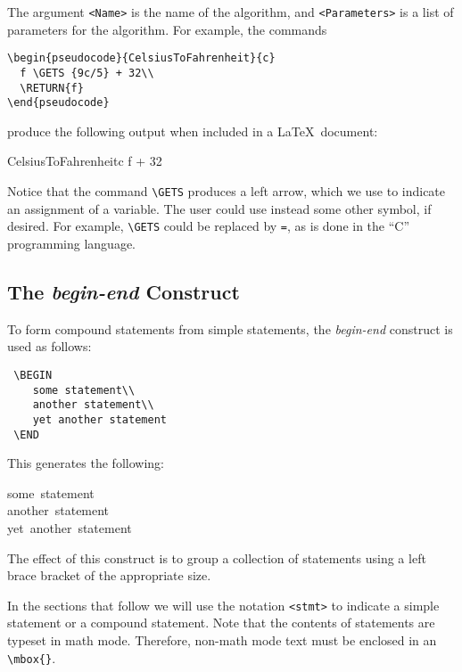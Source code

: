\documentclass{article}
\begin{document}
\noindent{}The argument  \verb+<Name>+ is the name of the algorithm, and
 \verb+<Parameters>+ is a list of parameters for the algorithm.
For example, the commands

\begin{verbatim}
\begin{pseudocode}{CelsiusToFahrenheit}{c}
  f \GETS {9c/5} + 32\\
  \RETURN{f}
\end{pseudocode}
\end{verbatim}

\noindent{}produce the following output when included in
a \LaTeX\  document:

\begin{pseudocode}{CelsiusToFahrenheit}{c}
  f  + 32\\
\end{pseudocode}

Notice that the command \verb+\GETS+ produces a 
left arrow, which we use to indicate an assignment of
a variable.  The user could use instead some other symbol, if desired.
For example, \verb+\GETS+ could be replaced by \verb+=+,
as is done in the ``C'' programming language.

\subsection{ The {\em begin-end} Construct}

To form compound statements from simple statements, the {\em begin-end} 
construct is used as follows:
\begin{verbatim}
 \BEGIN
    some statement\\
    another statement\\
    yet another statement
 \END
\end{verbatim}
This generates the following:

\medskip
\begin{pseudocode}[display]{}{}
\BEGIN
\mbox{some statement}\\
\mbox{another statement}\\
\mbox{yet another statement}
\END
\end{pseudocode}

\noindent{}The effect of this construct is to group 
a collection of statements
using a left brace bracket of the appropriate size.

In the sections that follow we will use the notation
\verb+<stmt>+
to indicate  a simple statement or a compound statement.
Note that the contents of statements are typeset in math mode.
Therefore, non-math mode text must be enclosed in an
\verb+\mbox{}+.
\end{document}
